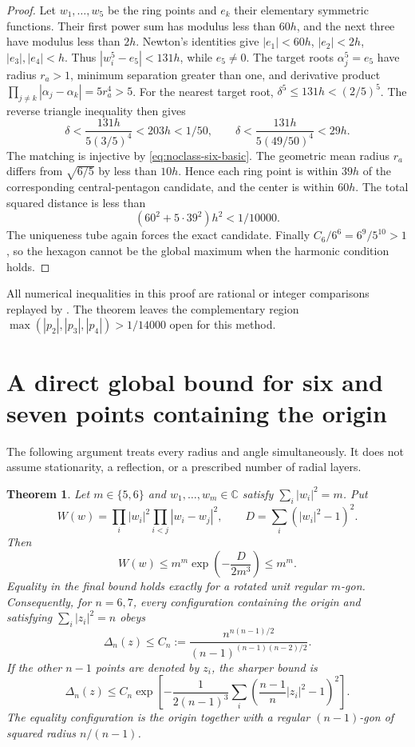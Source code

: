 \documentclass[11pt]{article}
\newtheorem{theorem}{Theorem}[section]
\theoremstyle{remark}
\numberwithin{equation}{section}
\begin{document}
\begin{proof}
Let $w_1,\ldots,w_5$ be the ring points and $e_k$ their elementary
symmetric functions. Their first power sum has modulus less than
$60h$, and the next three have modulus less than $2h$.
Newton's identities give
$|e_1|<60h$, $|e_2|<2h$, $|e_3|,|e_4|<h$.
Thus $|w_i^5-e_5|<131h$, while $e_5\ne0$.
The target roots $\alpha_j^5=e_5$ have radius $r_a>1$,
minimum separation greater than one, and derivative product
$\prod_{j\ne k}|\alpha_j-\alpha_k|=5r_a^4>5$.
For the nearest target root, $\delta^5\le131h<(2/5)^5$.
The reverse triangle inequality then gives
\[
 \delta<\frac{131h}{5(3/5)^4}<203h<1/50,\qquad
 \delta<\frac{131h}{5(49/50)^4}<29h.
\]
The matching is injective by \eqref{eq:noclass-six-basic}.
The geometric mean radius $r_a$ differs from $\sqrt{6/5}$
by less than $10h$. Hence each ring point is within $39h$ of
the corresponding central-pentagon candidate, and the center is
within $60h$. The total squared distance is less than
\[
                    (60^2+5\cdot39^2)h^2<1/10000.
\]
The uniqueness tube again forces the exact candidate.
Finally $C_6/6^6=6^9/5^{10}>1$, so the hexagon cannot be
the global maximum when the harmonic condition holds.
\end{proof}

All numerical inequalities in this proof are rational or integer
comparisons replayed by .
The theorem leaves the complementary region
$\max(|p_2|,|p_3|,|p_4|)>1/14000$ open for this method.

\section{A direct global bound for six and seven points containing the origin}
\label{sec:noclass-origin67}

The following argument treats every radius and angle simultaneously.
It does not assume stationarity, a reflection, or a prescribed number
of radial layers.

\begin{theorem}\label{thm:noclass-origin67}
Let $m\in\{5,6\}$ and $w_1,\ldots,w_m\in\mathbb C$ satisfy
$\sum_i|w_i|^2=m$. Put
\[
 W(w)=\prod_i|w_i|^2\prod_{i<j}|w_i-w_j|^2,\qquad
 D=\sum_i(|w_i|^2-1)^2.
\]
Then
\[
 W(w)\le m^m\exp\!\left(-\frac{D}{2m^3}\right)\le m^m.
\]
Equality in the final bound holds exactly for a rotated unit regular
$m$-gon. Consequently, for $n=6,7$, every configuration containing
the origin and satisfying $\sum_i|z_i|^2=n$ obeys
\[
 \Delta_n(z)\le
 C_n:=\frac{n^{n(n-1)/2}}{(n-1)^{(n-1)(n-2)/2}}.
\]
If the other $n-1$ points are denoted by $z_i$, the sharper bound is
\[
 \Delta_n(z)\le C_n\exp\!\left[
 -\frac{1}{2(n-1)^3}
 \sum_i\left(\frac{n-1}{n}|z_i|^2-1\right)^2\right].
\]
The equality configuration is the origin together with a regular
$(n-1)$-gon of squared radius $n/(n-1)$.
\end{theorem}
\end{document}
